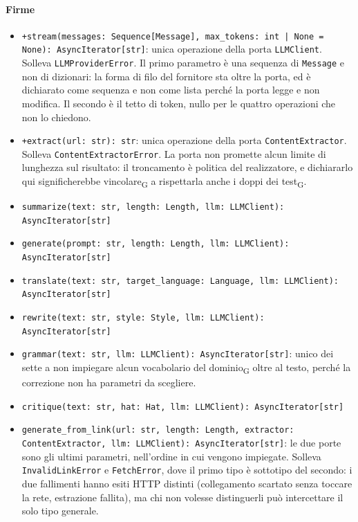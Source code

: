 \documentclass[a4paper, 10pt]{article}
\newenvironment{firme}{%
  \begin{itemize}[leftmargin=1.4em, topsep=4pt, itemsep=4pt, parsep=0pt]
  \raggedright
}{%
  \end{itemize}%
}
\begin{document}
\paragraph{Firme}
\begin{firme}
    \item \texttt{+stream(messages: Sequence[Message], max\_tokens: int | None = None): AsyncIterator[str]}: unica operazione della porta \texttt{LLMClient}. Solleva \texttt{LLMProviderError}. Il primo parametro è una sequenza di \texttt{Message} e non di dizionari: la forma di filo del fornitore sta oltre la porta, ed è dichiarato come sequenza e non come lista perché la porta legge e non modifica. Il secondo è il tetto di token, nullo per le quattro operazioni che non lo chiedono.

    \item \texttt{+extract(url: str): str}: unica operazione della porta \texttt{ContentExtractor}. Solleva \texttt{ContentExtractorError}. La porta non promette alcun limite di lunghezza sul risultato: il troncamento è politica del realizzatore, e dichiararlo qui significherebbe vincolare\textsubscript{G} a rispettarla anche i doppi dei test\textsubscript{G}.

    \item \texttt{summarize(text: str, length: Length, llm: LLMClient): AsyncIterator[str]}

    \item \texttt{generate(prompt: str, length: Length, llm: LLMClient): AsyncIterator[str]}

    \item \texttt{translate(text: str, target\_language: Language, llm: LLMClient): AsyncIterator[str]}

    \item \texttt{rewrite(text: str, style: Style, llm: LLMClient): AsyncIterator[str]}

    \item \texttt{grammar(text: str, llm: LLMClient): AsyncIterator[str]}: unico dei sette a non impiegare alcun vocabolario del dominio\textsubscript{G} oltre al testo, perché la correzione non ha parametri da scegliere.

    \item \texttt{critique(text: str, hat: Hat, llm: LLMClient): AsyncIterator[str]}

    \item \texttt{generate\_from\_link(url: str, length: Length, extractor: ContentExtractor, llm: LLMClient): AsyncIterator[str]}: le due porte sono gli ultimi parametri, nell'ordine in cui vengono impiegate. Solleva \texttt{InvalidLinkError} e \texttt{FetchError}, dove il primo tipo è sottotipo del secondo: i due fallimenti hanno esiti HTTP distinti (collegamento scartato senza toccare la rete, estrazione fallita), ma chi non volesse distinguerli può intercettare il solo tipo generale.


\end{firme}
\end{document}
